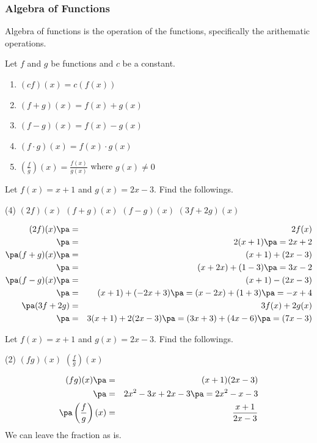\begin{frame}
\frametitle{Algebra of Functions}
Algebra of functions is the operation of the functions, specifically the arithematic operations.
\begin{prop}{}{}
Let $f$ and $g$ be functions and $c$ be a constant.
\begin{enumerate}
\item $(cf) (x) = c ( f(x) )$ \pa
\item $(f+g) (x) = f(x) + g(x)$ \pa
\item $(f-g) (x) = f(x) - g(x)$
\item $(f \cdot g) (x) = f(x) \cdot g(x) $
\item $ \left(\frac{f}{g}\right)(x) = \frac{f(x)}{g(x)}$ where $g(x) \neq 0$
\end{enumerate}
\end{prop}
\end{frame}


\begin{frame}[t]
\begin{ex}
Let $f(x) = x+1$ and $g(x) = 2x-3$. Find the followings.
\begin{tasks}(4)
\task $(2f)(x)$
\task $(f+g)(x)$ 
\task $(f - g)(x)$
\task $(3f + 2g)(x)$
\end{tasks}
\end{ex}
\begin{sol}
\begin{eqnarray*}
(2f)(x) \pa &=& 2f(x)  \\ \pa
&=& 2(x+1) \pa = 2x+2 \\ \pa
(f+g)(x) \pa &=& (x+1) + (2x-3)  \\ \pa
&=& (x+2x) + (1-3) \pa = 3x-2 \\ \pa
(f-g)(x) \pa &=& (x+1) - (2x-3) \\ \pa
&=& (x+1) + (-2x + 3) \pa = (x-2x) + (1+3) \pa = -x+4 \\ \pa
(3f + 2g) &=& 3f(x) + 2g(x) \\ \pa
&=& 3(x+1) + 2(2x-3) \pa = (3x+3) + (4x-6) \pa = (7x-3)
\end{eqnarray*}
\end{sol}
\end{frame}


\begin{frame}[t]
\begin{ex}
Let $f(x) = x+1$ and $g(x) = 2x-3$. Find the followings.
\begin{tasks}(2)
\task $(fg)(x)$
\task $\left( \frac{f}{g} \right)(x)$
\end{tasks}
\end{ex}
\begin{sol}
\begin{eqnarray*}
(fg)(x) \pa &=& (x+1)(2x-3) \\ \pa
&=& 2x^2-3x+2x-3 \pa = 2x^2-x-3\\ \pa
\left(\frac{f}{g} \right)(x)&=& \frac{x+1}{2x-3}
\end{eqnarray*}
We can leave the fraction as is.
\end{sol}
\end{frame}


